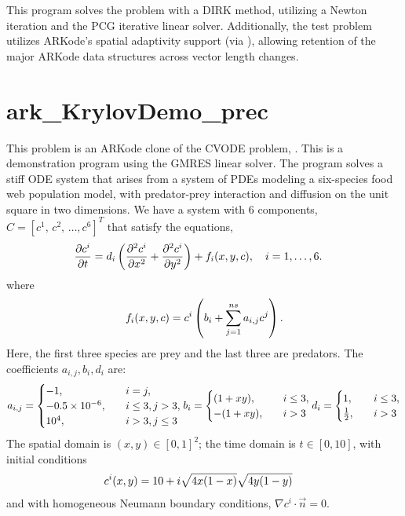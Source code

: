 \documentclass[letterpaper,10pt,english]{sphinxmanual}
\begin{document}
This program solves the problem with a DIRK method, utilizing a Newton
iteration and the PCG iterative linear solver.  Additionally, the test
problem utilizes ARKode's spatial adaptivity support (via
), allowing retention of the major ARKode data
structures across vector length changes.


\section{ark\_KrylovDemo\_prec}
\label{c_serial:ark-krylovdemo-prec}\label{c_serial:id30}
This problem is an ARKode clone of the CVODE problem,
.  This is a demonstration program using the
GMRES linear solver.  The program solves a stiff ODE system that arises
from a system of PDEs modeling a six-species food web population
model, with predator-prey interaction and diffusion on the unit square
in two dimensions. We have a system with 6 components, $C =
[c^1,\, c^2,\,\ldots, c^6]^T$ that satisfy the equations,
\begin{gather}
\begin{split}\frac{\partial c^i}{\partial t} &= d_i \left(\frac{\partial^2 c^i}{\partial
   x^2} + \frac{\partial^2 c^i}{\partial y^2}\right) +
   f_i(x,y,c),\quad i=1,\ldots,6.\end{split}\notag
\end{gather}
where
\begin{gather}
\begin{split}f_i(x,y,c) = c^i\left( b_i + \sum_{j=1}^{ns} a_{i,j} c^j\right).\end{split}\notag
\end{gather}
Here, the first three species are prey and the last three are
predators.  The coefficients $a_{i,j}, b_i, d_i$ are:
\begin{gather}
\begin{split}a_{i,j} = \begin{cases}
            -1, \quad & i=j,\\
            -0.5\times10^{-6}, \quad & i\le 3, j>3, \\
             10^4, \quad & i>3, j\le3
          \end{cases}
b_i = \begin{cases}
         (1+xy), \quad & i\le 3,\\
        -(1+xy), \quad & i>3
      \end{cases}
d_i = \begin{cases}
         1, \quad & i\le 3,\\
         \frac12, \quad & i>3
      \end{cases}\end{split}\notag
\end{gather}
The spatial domain is $(x,y) \in [0, 1]^2$; the time domain is
$t \in [0,10]$, with initial conditions
\begin{gather}
\begin{split}c^i(x,y) &=  10 + i \sqrt{4x(1-x)}\sqrt{4y(1-y)}\end{split}\notag
\end{gather}
and with homogeneous Neumann boundary conditions,
$\nabla c^i \cdot \vec{n} = 0$.
\end{document}
